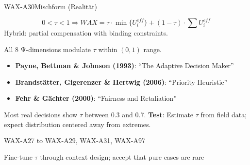 \begin{axiomspec}{WAX-A30}{Mischform (Realität)}

\begin{equation}
0 < \tau < 1 \Rightarrow WAX = \tau \cdot \min\{U_i^{eff}\} + (1-\tau) \cdot \sum U_i^{eff}
\end{equation}
Hybrid: partial compensation with binding constraints.

All 8 Ψ-dimensions modulate $\tau$ within $(0,1)$ range.

\begin{itemize}
\item \textbf{Payne, Bettman \& Johnson (1993)}: ``The Adaptive Decision Maker''
\item \textbf{Brandstätter, Gigerenzer \& Hertwig (2006)}: ``Priority Heuristic''
\item \textbf{Fehr \& Gächter (2000)}: ``Fairness and Retaliation''
\end{itemize}

Most real decisions show $\tau$ between 0.3 and 0.7.
\textbf{Test}: Estimate $\tau$ from field data; expect distribution centered away from extremes.

WAX-A27 to WAX-A29, WAX-A31, WAX-A97

Fine-tune $\tau$ through context design; accept that pure cases are rare

\end{axiomspec}


